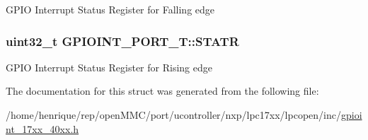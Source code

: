 G\-P\-I\-O Interrupt Status Register for Falling edge \hypertarget{structGPIOINT__PORT__T_afff0c48e8b49a668e3f7125b5443280a}{
\subsubsection[{S\-T\-A\-T\-R}]{ uint32\-\_\-t G\-P\-I\-O\-I\-N\-T\-\_\-\-P\-O\-R\-T\-\_\-\-T\-::\-S\-T\-A\-T\-R}}\label{structGPIOINT__PORT__T_afff0c48e8b49a668e3f7125b5443280a}
G\-P\-I\-O Interrupt Status Register for Rising edge 

The documentation for this struct was generated from the following file\-:\begin{DoxyCompactItemize}
\item 
/home/henrique/rep/open\-M\-M\-C/port/ucontroller/nxp/lpc17xx/lpcopen/inc/\hyperlink{gpioint__17xx__40xx_8h}{gpioint\-\_\-17xx\-\_\-40xx.\-h}\end{DoxyCompactItemize}
